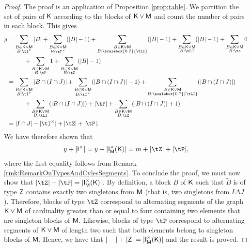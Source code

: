 \documentclass[11pt, a4paper, oneside, reqno]{amsart}
\newcommand{\sK}{{\sf K}}
\newcommand{\sM}{{\sf M}}
\theoremstyle{remark}
\theoremstyle{definition}
\numberwithin{equation}{section}
\begin{document}
\begin{proof}
The proof is an application of Proposition \ref{prop:table}. We partition the set of pairs of ${\sK}$ according to the blocks of ${\sK \vee \sM}$ and count the number of pairs in each block. This gives
\begin{align*}
	y & = \sum_{\substack{B \in \sK \vee \sM \\ B:\tI^{\circ}}}|B| + \sum_{\substack{B \in \sK \vee \sM \\ B:\tI^{\times}}}(|B|-1)+ \sum_{\substack{B \in \sK \vee \sM \\B:\scalebox{0.7}{\tLI}}}(|B|-1) + \sum_{\substack{B \in \sK \vee \sM \\ B:\tLJ}}(|B|-1) + \sum_{\substack{B \in \sK \vee \sM \\ B:\ts}} 0  \\ & \hspace{1cm}+\sum_{\substack{B \in \sK \vee \sM \\ B:\tP}} 1 + \sum_{\substack{B \in \sK \vee \sM \\ B:\tZ}} (|B|-1) \\
	  & =\sum_{\substack{B \in \sK \vee \sM \\ B:\tI^{\circ}}}|B\cap (I\cap J)| + \sum_{\substack{B \in \sK \vee \sM \\ B:\tI^{\times}}}(|B\cap (I\cap J)|-1)+ \sum_{\substack{B \in \sK \vee \sM \\B:\scalebox{0.7}{\tLI}}}(|B \cap (I\cap J)|) \\ & \hspace{1cm}+ \sum_{\substack{B \in \sK \vee \sM \\ B:\tLJ}}(|B \cap (I\cap J)|)      + |\tP| + \sum_{\substack{B \in \sK \vee \sM \\ B:\tZ}}(|B\cap (I\cap J)|+1)                                                                                          \\
	  & =|I\cap J| - |\tI^{\times}| + |\tZ| + |\tP|.
\end{align*}
We have therefore shown that
\begin{align}
	\label{eqn:relationy}
	y+|{\sf I}^{\times}| = y+|{\sf I}_{\sM}^{\times}({\sK})|=m + |\tZ|+|\tP|,
\end{align}
where the first equality follows from Remark \ref{rmk:RemarkOnTypesAndCylesSegments}.
To conclude the proof, we must now show that
$|\tZ|+|\tP| = |{\sf I}^{\times}_{\sM}({\sK})|$. By definition, a block $B$ of ${\sK}$ such that $\tilde{B}$ is of type ${\sf Z}$ contains exactly two singletons from ${\sf M}$ (that is, two singletons from $I\Delta J$). Therefore, blocks of type $\tZ$ correspond to alternating segments of the graph $\sK \vee \sM$ of cardinality greater than or equal to four containing two elements that are singleton blocks of ${\sM}$. Likewise, blocks of type $\tP$ correspond to alternating segments of $\sK \vee \sM$ of length two such that both elements belong to singleton blocks of ${\sM}$.
Hence, we have that
$
	|-| + |{\sf Z}| = |{\sf I}^{\times}_{\sf M}({\sf K})|
$ and the result is proved.
\end{proof}
\end{document}
